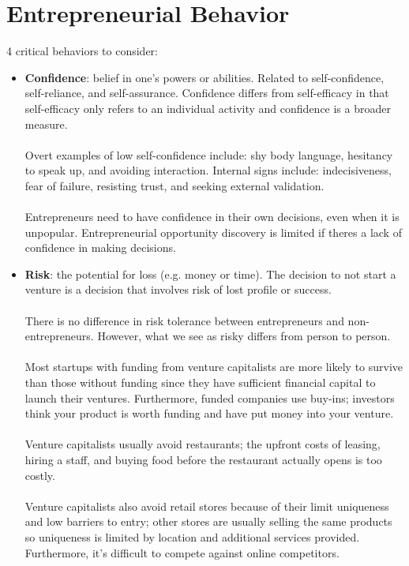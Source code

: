 \documentclass{article}
\begin{document}
  \section{Entrepreneurial Behavior}
  4 critical behaviors to consider:
  \begin{itemize}
    \item \textbf{Confidence}: belief in one's powers or abilities. Related to self-confidence, self-reliance, and self-assurance. Confidence differs from self-efficacy in that self-efficacy only refers to an individual activity and confidence is a broader measure. \\ \\
      Overt examples of low self-confidence include: shy body language, hesitancy to speak up, and avoiding interaction. Internal signs include: indecisiveness, fear of failure, resisting trust, and seeking external validation. \\ \\
      Entrepreneurs need to have confidence in their own decisions, even when it is unpopular. Entrepreneurial opportunity discovery is limited if theres a lack of confidence in making decisions.
    \item \textbf{Risk}: the potential for loss (e.g. money or time). The decision to not start a venture is a decision that involves risk of lost profile or success. \\ \\
      There is no difference in risk tolerance between entrepreneurs and non-entrepreneurs. However, what we see as risky differs from person to person. \\ \\
      Most startups with funding from venture capitalists are more likely to survive than those without funding since they have sufficient financial capital to launch their ventures. Furthermore, funded companies use buy-ins; investors think your product is worth funding and have put money into your venture. \\ \\
      Venture capitalists usually avoid restaurants; the upfront costs of leasing, hiring a staff, and buying food before the restaurant actually opens is too costly. \\ \\
      Venture capitalists also avoid retail stores because of their limit uniqueness and low barriers to entry; other stores are usually selling the same products so uniqueness is limited by location and additional services provided. Furthermore, it's difficult to compete against online competitors. \\ \\

\end{itemize}
\end{document}
